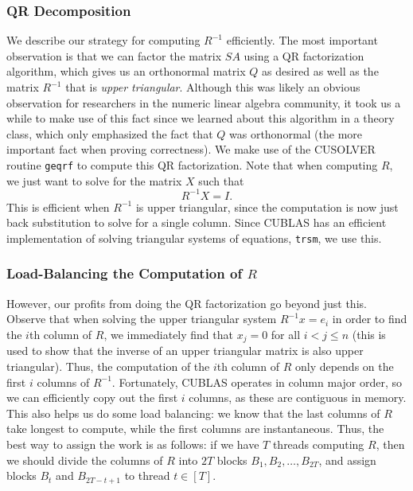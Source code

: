 \documentclass[12pt]{article}
\begin{document}
\subsubsection{QR Decomposition}
We describe our strategy for computing $R^{-1}$ efficiently. The most important observation is that we can factor the matrix $SA$ using a QR factorization algorithm, which gives us an orthonormal matrix $Q$ as desired as well as the matrix $R^{-1}$ that is \emph{upper triangular}. Although this was likely an obvious observation for researchers in the numeric linear algebra community, it took us a while to make use of this fact since we learned about this algorithm in a theory class, which only emphasized the fact that $Q$ was orthonormal (the more important fact when proving correctness). We make use of the CUSOLVER routine \texttt{geqrf} to compute this QR factorization. Note that when computing $R$, we just want to solve for the matrix $X$ such that
\[
	R^{-1}X = I.
\]
This is efficient when $R^{-1}$ is upper triangular, since the computation is now just back substitution to solve for a single column. Since CUBLAS has an efficient implementation of solving triangular systems of equations, \texttt{trsm}, we use this. 

\subsubsection{Load-Balancing the Computation of $R$}
However, our profits from doing the QR factorization go beyond just this. Observe that when solving the upper triangular system $R^{-1}x = e_i$ in order to find the $i$th column of $R$, we immediately find that $x_j = 0$ for all $i < j\leq n$ (this is used to show that the inverse of an upper triangular matrix is also upper triangular). Thus, the computation of the $i$th column of $R$ only depends on the first $i$ columns of $R^{-1}$. Fortunately, CUBLAS operates in column major order, so we can efficiently copy out the first $i$ columns, as these are contiguous in memory. This also helps us do some load balancing: we know that the last columns of $R$ take longest to compute, while the first columns are instantaneous. Thus, the best way to assign the work is as follows: if we have $T$ threads computing $R$, then we should divide the columns of $R$ into $2T$ blocks $B_1, B_2,\dots, B_{2T}$, and assign blocks $B_t$ and $B_{2T-t+1}$ to thread $t\in[T]$.
\end{document}
